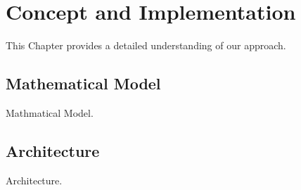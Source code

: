 \chapter{Concept and Implementation}
\label{chapter:conceptApproachSolution}


This Chapter provides a detailed understanding of our approach.

\section{Mathematical Model}
\label{subsec:mathModel}

Mathmatical Model.

\section{Architecture}

Architecture.
